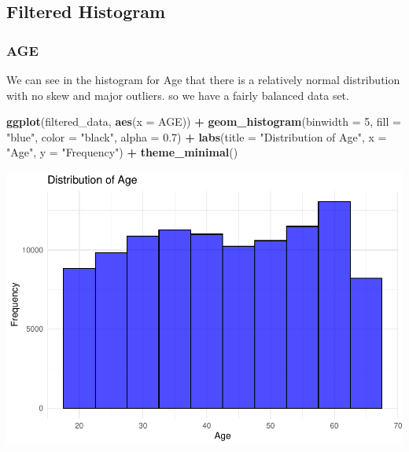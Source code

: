 \documentclass[
]{article}
\newenvironment{Shaded}{\begin{snugshade}}{\end{snugshade}}
\newcommand{\AttributeTok}[1]{\textcolor[rgb]{0.13,0.29,0.53}{#1}}
\newcommand{\DecValTok}[1]{\textcolor[rgb]{0.00,0.00,0.81}{#1}}
\newcommand{\FloatTok}[1]{\textcolor[rgb]{0.00,0.00,0.81}{#1}}
\newcommand{\FunctionTok}[1]{\textcolor[rgb]{0.13,0.29,0.53}{\textbf{#1}}}
\newcommand{\NormalTok}[1]{#1}
\newcommand{\SpecialCharTok}[1]{\textcolor[rgb]{0.81,0.36,0.00}{\textbf{#1}}}
\newcommand{\StringTok}[1]{\textcolor[rgb]{0.31,0.60,0.02}{#1}}
\begin{document}
\subsection{Filtered Histogram}\label{filtered-histogram}

\subsubsection{AGE}\label{age-1}

We can see in the histogram for Age that there is a relatively normal
distribution with no skew and major outliers. so we have a fairly
balanced data set.

\begin{Shaded}
\begin{Highlighting}[]
\FunctionTok{ggplot}\NormalTok{(filtered\_data, }\FunctionTok{aes}\NormalTok{(}\AttributeTok{x =}\NormalTok{ AGE)) }\SpecialCharTok{+}
  \FunctionTok{geom\_histogram}\NormalTok{(}\AttributeTok{binwidth =} \DecValTok{5}\NormalTok{, }\AttributeTok{fill =} \StringTok{"blue"}\NormalTok{, }\AttributeTok{color =} \StringTok{"black"}\NormalTok{, }\AttributeTok{alpha =} \FloatTok{0.7}\NormalTok{) }\SpecialCharTok{+}
  \FunctionTok{labs}\NormalTok{(}\AttributeTok{title =} \StringTok{"Distribution of Age"}\NormalTok{, }\AttributeTok{x =} \StringTok{"Age"}\NormalTok{, }\AttributeTok{y =} \StringTok{"Frequency"}\NormalTok{) }\SpecialCharTok{+}
  \FunctionTok{theme\_minimal}\NormalTok{()}
\end{Highlighting}
\end{Shaded}

\includegraphics{Project_1_456_files/figure-latex/unnamed-chunk-7-1.pdf}
\end{document}
